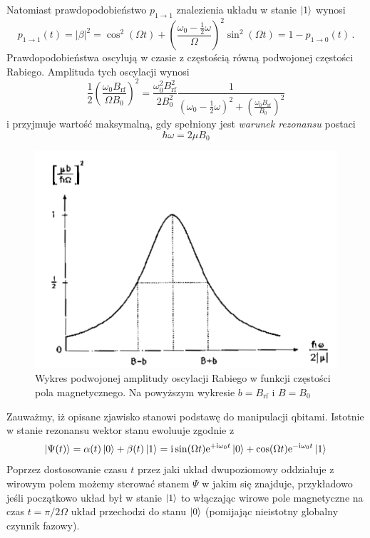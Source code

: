 \documentclass{myclass}
\begin{document}
Natomiast prawdopodobieństwo \(p_{1\to1}\) znalezienia układu w stanie \(\ket{1}\) wynosi
\begin{equation*}
        p_{1\to1}(t) = |\beta|^2 =\cos^2(\Omega t) + \left(\frac{\omega_0 - \frac{1}{2}\omega}{\Omega}\right)^2\sin^2(\Omega t) = 1 - p_{1\to 0}(t)\,.
\end{equation*}
Prawdopodobieństwa oscylują w czasie z częstością równą podwojonej częstości Rabiego. Amplituda tych
oscylacji wynosi
\begin{equation*}
    \frac{1}{2}\left(\frac{\omega_0B_\text{rf}}{\Omega B_0}\right)^2 = \frac{\omega_0^2B_\text{rf}^2}{2B_0^2}\frac{1}{\left(\omega_0 - \frac{1}{2}\omega\right)^2 +
    \left(\frac{\omega_0B_\text{rf}}{B_0}\right)^2}
\end{equation*}
i przyjmuje wartość maksymalną, gdy spełniony jest \textit{warunek rezonansu} postaci
\begin{equation*}
    \boxed{\hbar\omega = 2\mu B_0}
\end{equation*}
\begin{figure}[ht]
    \centering
    \includegraphics[width=0.7\columnwidth]{figs/nmr.png}
    \caption{Wykres podwojonej amplitudy oscylacji Rabiego w funkcji częstości pola magnetycznego.
    Na powyższym wykresie \(b=B_\text{rf}\) i \(B=B_0\)}
\end{figure}

Zauważmy, iż opisane zjawisko stanowi podstawę do manipulacji qbitami. Istotnie w stanie rezonansu
wektor stanu ewoluuje zgodnie z
\begin{equation*}
    \ket{\Psi(t)} = \alpha(t)\ket{0} + \beta(t)\ket{1} = \mathrm{i}\sin(\Omega t)\mathrm{e}^{+\mathrm{i}\omega_0 t}\ket{0} + \cos(\Omega t)\mathrm{e}^{-\mathrm{i}\omega_0 t}\ket{1}
\end{equation*}
Poprzez dostosowanie czasu \(t\) przez jaki układ dwupoziomowy oddziałuje z wirowym polem możemy
sterować stanem \(\Psi\) w jakim się znajduje, przykładowo jeśli początkowo układ był w stanie
\(\ket{1}\) to włączając wirowe pole magnetyczne na czas \(t = \pi/2\Omega\) układ przechodzi do
stanu \(\ket{0}\) (pomijając nieistotny globalny czynnik fazowy).
\end{document}
